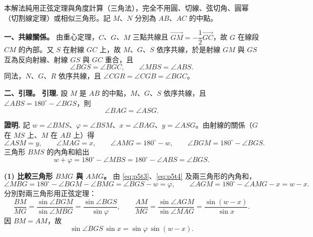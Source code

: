 \setcounter{equation}{0}
本解法純用正弦定理與角度計算（三角法），完全不用圓、切線、弦切角、圓幂（切割線定理）或相似三角形。記 $M$、$N$ 分別為 $AB$、$AC$ 的中點。

\textbf{一、共線關係。}
由重心定理，$C$、$G$、$M$ 三點共線且 $\overrightarrow{GM}=-\dfrac{1}{2}\overrightarrow{GC}$，故 $G$ 在線段 $CM$ 的內部。又 $S$ 在射線 $GC$ 上，故 $M$、$G$、$S$ 依序共線，於是射線 $GM$ 與 $GS$ 互為反向射線、射線 $GS$ 與 $GC$ 重合，且
\begin{equation}\label{eq:p5t1}
  \angle{BGS}=\angle{BGC},\qquad \angle{MBS}=\angle{ABS}.
\end{equation}
同法，$N$、$G$、$R$ 依序共線，且 $\angle{CGR}=\angle{CGB}=\angle{BGC}$。

\textbf{二、引理。}
\textbf{引理.} 設 $M$ 是 $AB$ 的中點，$M$、$G$、$S$ 依序共線，且 $\angle{ABS}=180^{\circ}-\angle{BGS}$，則
\begin{equation}\label{eq:p5t2}
  \angle{BAG}=\angle{ASG}.
\end{equation}

\textbf{證明.} 記 $w=\angle{BMS}$、$\varphi=\angle{BSM}$、$x=\angle{BAG}$、$y=\angle{ASG}$。由射線的關係（$G$ 在 $MS$ 上、$M$ 在 $AB$ 上）得
\begin{equation}\label{eq:p5t3}
  \angle{ASM}=y,\qquad \angle{MAG}=x,\qquad \angle{AMG}=180^{\circ}-w,\qquad \angle{BGM}=180^{\circ}-\angle{BGS}.
\end{equation}
三角形 $BM\!S$ 的內角和給出
\begin{equation}\label{eq:p5t4}
  w+\varphi=180^{\circ}-\angle{MBS}=180^{\circ}-\angle{ABS}=\angle{BGS}.
\end{equation}

\textbf{(1) 比較三角形 $BMG$ 與 $AMG$。}
由 \eqref{eq:p5t3}、\eqref{eq:p5t4} 及兩三角形的內角和，
\begin{equation}\label{eq:p5t5}
  \angle{MBG}=180^{\circ}-\angle{BGM}-\angle{BMG}=\angle{BGS}-w=\varphi,
  \qquad
  \angle{AGM}=180^{\circ}-\angle{AMG}-x=w-x .
\end{equation}
分別對兩三角形用正弦定理：
\begin{equation}\label{eq:p5t6}
  \frac{BM}{MG}=\frac{\sin\angle{BGM}}{\sin\angle{MBG}}=\frac{\sin\angle{BGS}}{\sin\varphi},
  \qquad
  \frac{AM}{MG}=\frac{\sin\angle{AGM}}{\sin\angle{MAG}}=\frac{\sin(w-x)}{\sin x}.
\end{equation}
因 $BM=AM$，故
\begin{equation}\label{eq:p5t7}
  \sin\angle{BGS}\,\sin x=\sin\varphi\,\sin(w-x).
\end{equation}

